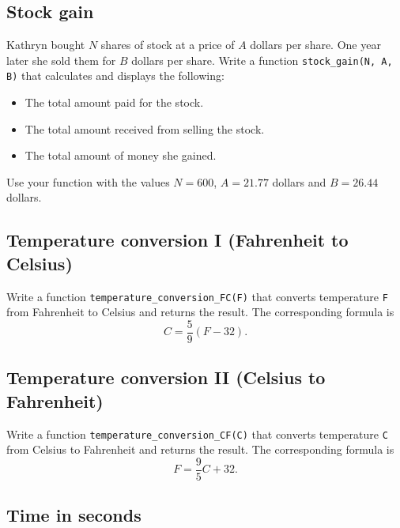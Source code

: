 
\subsection{Stock gain}

Kathryn bought $N$ shares of stock at a price of $A$ dollars per share. One year later she 
sold them for $B$ dollars per share. Write a function {\tt stock\_gain(N, A, B)} that calculates and 
displays the following:
\begin{itemize}
\item The total amount paid for the stock.
\item The total amount received from selling the stock.
\item The total amount of money she gained.
\end{itemize}
Use your function with the values $N = 600$, $A = 21.77$ dollars and $B = 26.44$ dollars.


\subsection{Temperature conversion I (Fahrenheit to Celsius)}

Write a function {\tt temperature\_conversion\_FC(F)} that converts 
temperature {\tt F} from Fahrenheit to Celsius and returns the
result. The corresponding formula is 
$$
C = \frac{5}{9}(F - 32).
$$


\subsection{Temperature conversion II (Celsius to Fahrenheit)}

Write a function {\tt temperature\_conversion\_CF(C)} that converts 
temperature {\tt C} from Celsius to Fahrenheit and returns the
result. The corresponding formula is 
$$
F = \frac{9}{5}C + 32.
$$


\subsection{Time in seconds}

